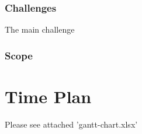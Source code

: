 \documentclass[12pt]{article}
\begin{document}
\subsubsection{Challenges}
The main challenge 

\subsubsection{Scope}


\section{Time Plan}
Please see attached 'gantt-chart.xlsx'
\end{document}
